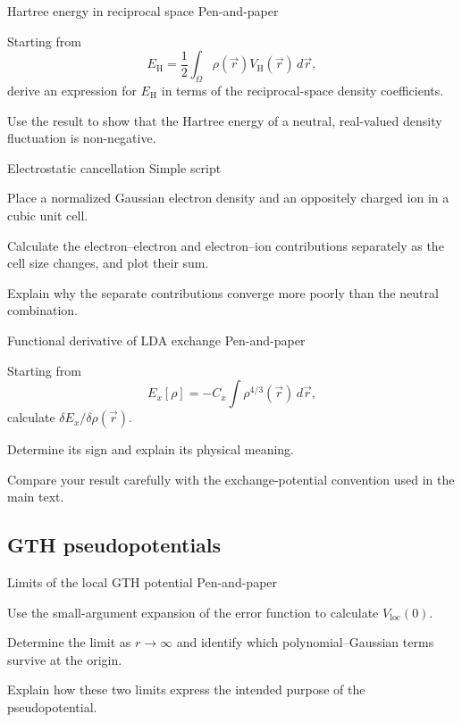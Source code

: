 \begin{exci}{Hartree energy in reciprocal space \hfill\textnormal{\small Pen-and-paper}}
    \item Starting from
    \begin{equation*}
        E_{\textrm{H}}=\frac{1}{2}\int_{\Omega}
        \rho(\vec{r})V_{\textrm{H}}(\vec{r})\,d\vec{r},
    \end{equation*}
    derive an expression for $E_{\textrm{H}}$ in terms of the reciprocal-space
    density coefficients.
    \item Use the result to show that the Hartree energy of a neutral,
    real-valued density fluctuation is non-negative.
\end{exci}

\begin{exci}{Electrostatic cancellation \hfill\textnormal{\small Simple script}}
    \item Place a normalized Gaussian electron density and an oppositely
    charged ion in a cubic unit cell.
    \item Calculate the electron--electron and electron--ion contributions
    separately as the cell size changes, and plot their sum.
    \item Explain why the separate contributions converge more poorly than the
    neutral combination.
\end{exci}

\begin{exci}{Functional derivative of LDA exchange \hfill\textnormal{\small Pen-and-paper}}
    \item Starting from
    \begin{equation*}
        E_{x}[\rho]=-C_{x}\int \rho^{4/3}(\vec{r})\,d\vec{r},
    \end{equation*}
    calculate $\delta E_x/\delta\rho(\vec{r})$.
    \item Determine its sign and explain its physical meaning.
    \item Compare your result carefully with the exchange-potential convention
    used in the main text.
\end{exci}

%
%
%
\subsection{GTH pseudopotentials}

\begin{exci}{Limits of the local GTH potential \hfill\textnormal{\small Pen-and-paper}}
    \item Use the small-argument expansion of the error function to calculate
    $V_{\textrm{loc}}(0)$.
    \item Determine the limit as $r\rightarrow\infty$ and identify which
    polynomial--Gaussian terms survive at the origin.
    \item Explain how these two limits express the intended purpose of the
    pseudopotential.
\end{exci}

